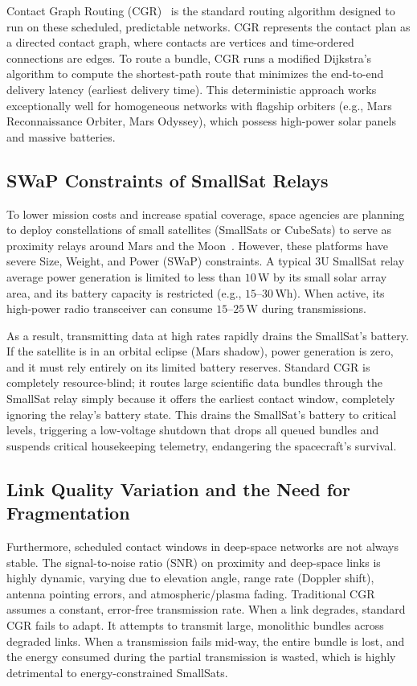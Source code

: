 \documentclass[a4paper,fleqn]{cas-dc}
\begin{document}
Contact Graph Routing (CGR)~\cite{burleigh2010cgr} is the standard routing algorithm designed to run on these scheduled, predictable networks. CGR represents the contact plan as a directed contact graph, where contacts are vertices and time-ordered connections are edges. To route a bundle, CGR runs a modified Dijkstra's algorithm to compute the shortest-path route that minimizes the end-to-end delivery latency (earliest delivery time). This deterministic approach works exceptionally well for homogeneous networks with flagship orbiters (e.g., Mars Reconnaissance Orbiter, Mars Odyssey), which possess high-power solar panels and massive batteries.

\subsection{SWaP Constraints of SmallSat Relays}
To lower mission costs and increase spatial coverage, space agencies are planning to deploy constellations of small satellites (SmallSats or CubeSats) to serve as proximity relays around Mars and the Moon~\cite{nasa2022artemis,selva2012survey}. However, these platforms have severe Size, Weight, and Power (SWaP) constraints. A typical 3U SmallSat relay average power generation is limited to less than $10\,$W by its small solar array area, and its battery capacity is restricted (e.g., $15$--$30\,$Wh). When active, its high-power radio transceiver can consume $15$--$25\,$W during transmissions.

As a result, transmitting data at high rates rapidly drains the SmallSat's battery. If the satellite is in an orbital eclipse (Mars shadow), power generation is zero, and it must rely entirely on its limited battery reserves. Standard CGR is completely resource-blind; it routes large scientific data bundles through the SmallSat relay simply because it offers the earliest contact window, completely ignoring the relay's battery state. This drains the SmallSat's battery to critical levels, triggering a low-voltage shutdown that drops all queued bundles and suspends critical housekeeping telemetry, endangering the spacecraft's survival.

\subsection{Link Quality Variation and the Need for Fragmentation}
Furthermore, scheduled contact windows in deep-space networks are not always stable. The signal-to-noise ratio (SNR) on proximity and deep-space links is highly dynamic, varying due to elevation angle, range rate (Doppler shift), antenna pointing errors, and atmospheric/plasma fading. Traditional CGR assumes a constant, error-free transmission rate. When a link degrades, standard CGR fails to adapt. It attempts to transmit large, monolithic bundles across degraded links. When a transmission fails mid-way, the entire bundle is lost, and the energy consumed during the partial transmission is wasted, which is highly detrimental to energy-constrained SmallSats.
\end{document}
